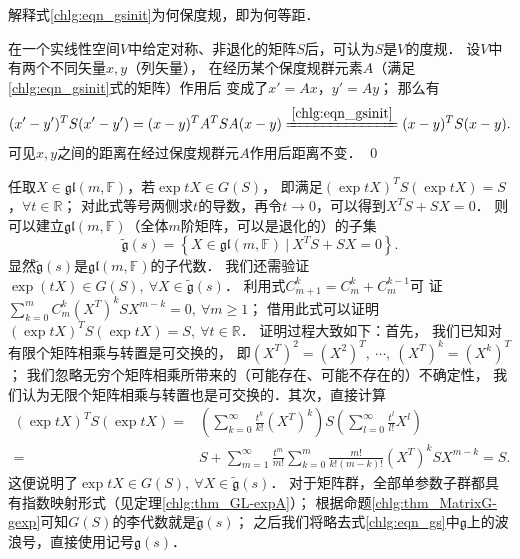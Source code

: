 \begin{example}
	解释式\eqref{chlg:eqn_gsinit}为何保度规，即为何等距．
\end{example}	
	在一个实线性空间$V$中给定对称、非退化的矩阵$S$后，可认为$S$是$V$的度规．
	设$V$中有两个不同矢量$x,y$（列矢量），
	在经历某个保度规群元素$A$（满足\eqref{chlg:eqn_gsinit}式的矩阵）作用后
	变成了$x'=Ax$，$y'= Ay$；    那么有
	\begin{equation*}
		(x'-y')^T S (x'-y') = (x-y)^T A^T S A (x-y)
		\xlongequal{\ref{chlg:eqn_gsinit}}  (x-y)^T S (x-y).
	\end{equation*}
	可见$x,y$之间的距离在经过保度规群元$A$作用后{\kaishu 距离不变}． \qed


任取$X\in \mathfrak{gl}(m,\mathbb{F})$，若$\exp tX \in G(S)$，
即满足$(\exp tX)^T S (\exp t{X}) = S$，$ \forall t\in \mathbb{R} $；
对此式等号两侧求$t$的导数，再令$t\to 0$，可以得到$X^T S + S {X} = 0 $．
则可以建立$\mathfrak{gl}(m,\mathbb{F})$（全体$m$阶矩阵，可以是退化的）的子集
\begin{equation} \label{chlg:eqn_gs}
    \tilde{\mathfrak{g}}(s) = \left\{ X \in \mathfrak{gl}(m,\mathbb{F}) \ |\ 
       X^T S + S {X} = 0 \right\} .
\end{equation}
显然$\tilde{\mathfrak{g}}(s)$是$\mathfrak{gl}(m,\mathbb{F})$的子代数．
我们还需验证$\exp(tX)\in G(S),\ \forall X \in \tilde{\mathfrak{g}}(s)$．%
利用式$C_{m + 1}^k = C_m^k + C_m^{k - 1}$可
证$ \sum_{k=0}^{m}C^k_m (X^T)^k S {X}^{m-k} =0, \ \forall m\geqslant 1 $；
借用此式可以证明$(\exp tX)^T S (\exp t{X}) = S, \ \forall t\in \mathbb{R}$．
证明过程大致如下：首先，
我们已知对有限个矩阵相乘与转置是可交换的，
即$(X^T)^2 = (X^2)^T,\ \cdots,\ (X^T)^k = (X^k)^T$；
我们忽略无穷个矩阵相乘所带来的（可能存在、可能不存在的）不确定性，
我们认为无限个矩阵相乘与转置也是可交换的．其次，直接计算
\begin{align*}
    (\exp tX)^T S (\exp t{X}) = & \left(\sum_{k=0}^{\infty}\frac{t^k}{k!}({X}^T)^k\right)
    S\left(\sum_{l=0}^{\infty}\frac{t^l}{l!}X^l\right) \\
    =& S + \sum_{m=1}^{\infty}\frac{t^m}{m!} \sum_{k=0}^{m}
    \frac{m!}{k!(m-k)!} (X^T)^k S {X}^{m-k} =S .
\end{align*}
这便说明了$\exp tX \in G(S),\ \forall X\in \tilde{\mathfrak{g}}(s)$．
对于矩阵群，全部单参数子群都具有指数映射形式（见定理\ref{chlg:thm_GL-expA}）；
根据命题\ref{chlg:thm_MatrixG-gexp}可知$G(S)$的李代数就是$\tilde{\mathfrak{g}}(s)$；
之后我们将略去式\eqref{chlg:eqn_gs}中$\mathfrak{g}$上的波浪号，直接使用记号$\mathfrak{g}(s)$．




